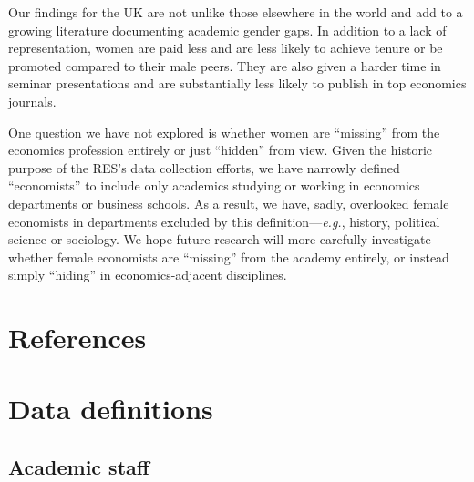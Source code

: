 \documentclass[a4paper, 1]{article}
\begin{document}
Our findings for the UK are not unlike those elsewhere in the world and add to a growing literature documenting academic gender gaps. In addition to a lack of representation, women are paid less and are less likely to achieve tenure or be promoted compared to their male peers. They are also given a harder time in seminar presentations and are substantially less likely to publish in top economics journals.

One question we have not explored is whether women are ``missing'' from the economics profession entirely or just ``hidden'' from view. Given the historic purpose of the RES's data collection efforts, we have narrowly defined ``economists'' to include only academics studying or working in economics departments or business schools. As a result, we have, sadly, overlooked female economists in departments excluded by this definition---\emph{e.g.}, history, political science or sociology. We hope future research will more carefully investigate whether female economists are ``missing'' from the academy entirely, or instead simply ``hiding'' in economics-adjacent disciplines.

\newpage

\hypertarget{references}{%
\section*{References}\label{references}}



\newpage

\hypertarget{appendix-appendix}{%
\appendix}


\setcounter{figure}{0}
\setcounter{table}{0}
\setcounter{equation}{0}
\renewcommand{\thetable}{\thesection.\arabic{table}}
\renewcommand{\thefigure}{\thesection.\arabic{figure}}
\appendixpage

\hypertarget{sec:data-definitions}{%
\section{Data definitions}\label{sec:data-definitions}}

\hypertarget{staff-definitions}{%
\subsection*{Academic staff}\label{staff-definitions}}
\end{document}

